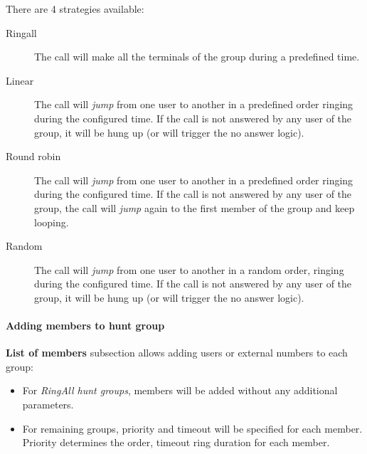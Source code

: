 \documentclass[letterpaper,10pt,spanish]{sphinxmanual}
\begin{document}
There are 4 strategies available:
\begin{description}
\item[{Ringall}] \leavevmode{}\label{administration_portal/client/vpbx/routing_endpoints/hunt_groups:term-ringall}
The call will make all the terminals of the group during a predefined
time.

\item[{Linear}] \leavevmode{}\label{administration_portal/client/vpbx/routing_endpoints/hunt_groups:term-linear}
The call will \emph{jump} from one user to another in a predefined order
ringing during the configured time. If the call is not answered by any
user of the group, it will be hung up (or will trigger the no answer logic).

\item[{Round robin}] \leavevmode{}\label{administration_portal/client/vpbx/routing_endpoints/hunt_groups:term-round-robin}
The call will \emph{jump} from one user to another in a predefined order
ringing during the configured time. If the call is not answered by any
user of the group, the call will \emph{jump} again to the first member of the
group and keep looping.

\item[{Random}] \leavevmode{}\label{administration_portal/client/vpbx/routing_endpoints/hunt_groups:term-random}
The call will \emph{jump} from one user to another in a random order,
ringing during the configured time.  If the call is not answered by any
user of the group, it will be hung up (or will trigger the no answer logic).

\end{description}


\paragraph{Adding members to hunt group}
\label{administration_portal/client/vpbx/routing_endpoints/hunt_groups:adding-members-to-hunt-group}
\textbf{List of members} subsection allows adding users or external numbers to each group:
\begin{itemize}
\item {} 
For \emph{RingAll hunt groups}, members will be added without any additional parameters.

\item {} 
For remaining groups, priority and timeout will be specified for each member. Priority determines the order, timeout ring
duration for each member.

\end{itemize}
\end{document}
